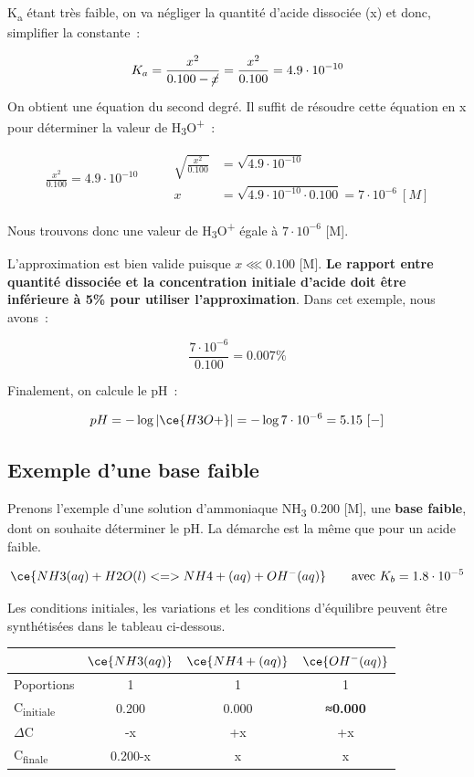 \documentclass[
  11pt,
  french,
  a4paper,
  openany]{book}
\begin{document}
K\textsubscript{a} étant très faible, on va négliger la quantité d'acide dissociée (x) et donc, simplifier la constante~:

\[
K_a = \frac{x^2}{0.100 - \cancel{x}} = \frac{x^2}{0.100} = 4.9 \cdot 10^{-10}
\]

On obtient une équation du second degré. Il suffit de résoudre cette équation en x pour déterminer la valeur de \textbar H\textsubscript{3}O\textsuperscript{+}\textbar~:

\[
\begin{split}
\frac{x^2}{0.100} = 4.9 \cdot 10^{-10}
\end{split}
\qquad
\begin{split}
\sqrt{\frac{x^2}{0.100}} &= \sqrt{4.9 \cdot 10^{-10}} \\
x &= \sqrt{4.9 \cdot 10^{-10} \cdot 0.100} = 7 \cdot 10^{-6}\ [M]
\end{split}
\]

Nous trouvons donc une valeur de \textbar H\textsubscript{3}O\textsuperscript{+}\textbar{} égale à \(7 \cdot 10^{-6}\) {[}M{]}.

L'approximation est bien valide puisque \(x \lll 0.100\) {[}M{]}. \textbf{Le rapport entre quantité dissociée et la concentration initiale d'acide doit être inférieure à 5\% pour utiliser l'approximation}. Dans cet exemple, nous avons~:

\[
\frac{7 \cdot 10^{-6}}{0.100} = 0.007\%
\]

Finalement, on calcule le pH~:

\[
pH = - \log |\ce{H3O+}| = - \log 7 \cdot 10^{-6} = 5.15\ [-]
\]

\hypertarget{exemple-dune-base-faible}{%
\subsection{Exemple d'une base faible}\label{exemple-dune-base-faible}}

Prenons l'exemple d'une solution d'ammoniaque NH\textsubscript{3} 0.200 {[}M{]}, une \textbf{base faible}, dont on souhaite déterminer le pH. La démarche est la même que pour un acide faible.

\[
\ce{NH3(aq) + H2O(l) <=> NH4+(aq) + OH^{-}(aq)} \qquad \text{avec } K_b = 1.8 \cdot 10^{-5}
\]

Les conditions initiales, les variations et les conditions d'équilibre peuvent être synthétisées dans le tableau ci-dessous.

\begin{longtable}[]{@{}lccc@{}}
\toprule
& \(\ce{NH3(aq)}\) & \(\ce{NH4+(aq)}\) & \(\ce{OH^{-}(aq)}\)\tabularnewline
\midrule
\endhead
Poportions & 1 & 1 & 1\tabularnewline
C\textsubscript{initiale} & 0.200 & 0.000 & \textbf{≈0.000}\tabularnewline
\(\Delta\)C & -x & +x & +x\tabularnewline
C\textsubscript{finale} & 0.200-x & x & x\tabularnewline
\bottomrule
\end{longtable}
\end{document}
